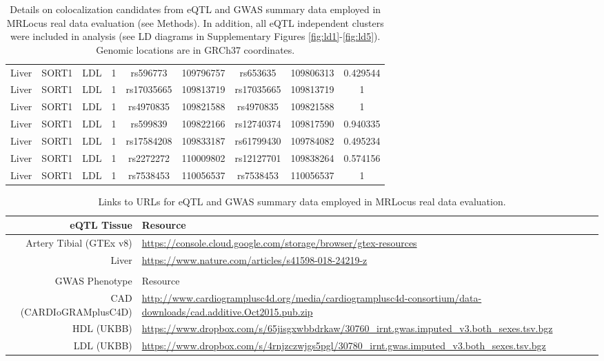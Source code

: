 \documentclass[11pt]{article}
\begin{document}
\begin{table}[!ht]
\begin{tabular}{ccccccccc}
Liver & SORT1 & LDL & 1 & rs596773 & 109796757 & rs653635 & 109806313 & 0.429544 \\ 
Liver & SORT1 & LDL & 1 & rs17035665 & 109813719 & rs17035665 & 109813719 & 1 \\ 
Liver & SORT1 & LDL & 1 & rs4970835 & 109821588 & rs4970835 & 109821588 & 1 \\ 
Liver & SORT1 & LDL & 1 & rs599839 & 109822166 & rs12740374 & 109817590 & 0.940335 \\ 
Liver & SORT1 & LDL & 1 & rs17584208 & 109833187 & rs61799430 & 109784082 & 0.495234 \\ 
Liver & SORT1 & LDL & 1 & rs2272272 & 110009802 & rs12127701 & 109838264 & 0.574156 \\ 
Liver & SORT1 & LDL & 1 & rs7538453 & 110056537 & rs7538453 & 110056537 & 1 \\
\end{tabular}
\caption{Details on colocalization candidates from eQTL and GWAS
  summary data employed in MRLocus real data evaluation (see
  Methods). In addition, all eQTL independent clusters were included
  in analysis (see LD diagrams in Supplementary Figures
  \ref{fig:ld1}-\ref{fig:ld5}). Genomic locations are in GRCh37
  coordinates.}
\end{table}

\begin{table}[!ht]
\centering
\footnotesize
\begin{tabular}{r p{4in}}
eQTL Tissue & Resource \\
\hline
Artery Tibial (GTEx v8) & \url{https://console.cloud.google.com/storage/browser/gtex-resources} \\
Liver & \url{https://www.nature.com/articles/s41598-018-24219-z} \\
& \\
GWAS Phenotype & Resource \\
\hline
CAD (CARDIoGRAMplusC4D) & \url{http://www.cardiogramplusc4d.org/media/cardiogramplusc4d-consortium/data-downloads/cad.additive.Oct2015.pub.zip} \\
HDL (UKBB) & \url{https://www.dropbox.com/s/65jisgxwbbdrkaw/30760_irnt.gwas.imputed_v3.both_sexes.tsv.bgz} \\
LDL (UKBB) & \url{https://www.dropbox.com/s/4rnjzczwjgs5pgl/30780_irnt.gwas.imputed_v3.both_sexes.tsv.bgz} \\
\end{tabular}
\caption{Links to URLs for eQTL and GWAS summary data employed in
  MRLocus real data evaluation.}
\end{table}
\end{document}
